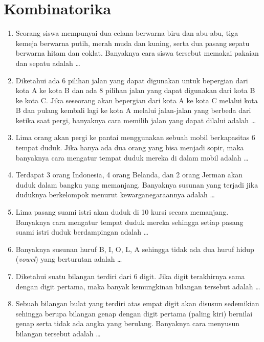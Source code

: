 \documentclass[12pt]{scrartcl}
\begin{document}
\section{Kombinatorika}
\begin{enumerate}
	\item
	Seorang siswa mempunyai dua celana berwarna biru dan abu-abu, tiga kemeja berwarna putih, merah muda dan kuning, serta dua pasang sepatu berwarna hitam dan coklat. Banyaknya cara siswa tersebut memakai pakaian dan sepatu adalah \dots

	\item
	Diketahui ada 6 pilihan jalan yang dapat digunakan untuk bepergian dari kota A ke kota B dan ada 8 pilihan jalan yang dapat digunakan dari kota B ke kota C. Jika seseorang akan bepergian dari kota A ke kota C melalui kota B dan pulang kembali lagi ke kota A melalui jalan-jalan yang berbeda dari ketika saat pergi, banyaknya cara memilih jalan yang dapat dilalui adalah \dots

	\item
	Lima orang akan pergi ke pantai menggunakan sebuah mobil berkapasitas 6 tempat duduk. Jika hanya ada dua orang yang bisa menjadi sopir, maka banyaknya cara mengatur tempat duduk mereka di dalam mobil adalah \dots

	\item
	Terdapat 3 orang Indonesia, 4 orang Belanda, dan 2 orang Jerman akan duduk dalam bangku yang memanjang. Banyaknya susunan yang terjadi jika duduknya berkelompok menurut kewarganegaraannya adalah \dots

	\item
	Lima pasang suami istri akan duduk di 10 kursi secara memanjang. Banyaknya cara mengatur tempat duduk mereka sehingga setiap pasang suami istri duduk berdampingan adalah \dots

	\item
	Banyaknya susunan huruf B, I, O, L, A sehingga tidak ada dua huruf hidup (\textit{vowel}) yang berturutan adalah \dots

	\item
	Diketahui suatu bilangan terdiri dari 6 digit. Jika digit terakhirnya sama dengan digit pertama, maka banyak kemungkinan bilangan tersebut adalah \dots

	\item
	Sebuah bilangan bulat yang terdiri atas empat digit akan disusun sedemikian sehingga berupa bilangan genap dengan digit pertama (paling kiri) bernilai genap serta tidak ada angka yang berulang. Banyaknya cara menyusun bilangan tersebut adalah \dots
\end{enumerate}
\end{document}
